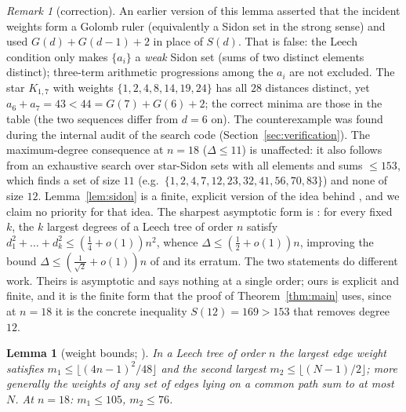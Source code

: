 \documentclass[11pt,a4paper]{article}
\theoremstyle{plain}
\newtheorem{lemma}[theorem]{Lemma}
\theoremstyle{remark}
\newtheorem*{remark*}{Remark}
\begin{document}
\begin{remark*}[correction]
An earlier version of this lemma asserted that the incident weights form a
Golomb ruler (equivalently a Sidon set in the strong sense) and used
$G(d)+G(d-1)+2$ in place of $S(d)$.  That is false: the Leech condition only
makes $\{a_i\}$ a \emph{weak} Sidon set (sums of two distinct elements
distinct); three-term arithmetic progressions among the $a_i$ are not excluded.
The star $K_{1,7}$ with weights $\{1,2,4,8,14,19,24\}$ has all $28$ distances
distinct, yet $a_6+a_7=43<44=G(7)+G(6)+2$; the correct minima are those in the
table (the two sequences differ from $d=6$ on).  The counterexample was found
during the internal audit of the search code (Section~\ref{sec:verification}).
The maximum-degree consequence at $n=18$ ($\Delta\le 11$) is unaffected: it
also follows from an exhaustive search over star-Sidon sets with all elements
and sums $\le 153$, which finds a set of size $11$ (e.g.\
$\{1,2,4,7,12,23,32,41,56,70,83\}$) and none of size $12$.
Lemma~\ref{lem:sidon} is a finite, explicit version of the idea behind
\cite[Thm.~3]{SzekelyWangZhang2005}, and we claim no priority for that idea.
The sharpest asymptotic form is \cite[Thm.~1.4]{LuoYu2024}: for every fixed
$k$, the $k$ largest degrees of a Leech tree of order $n$ satisfy
$d_1^2+\dots+d_k^2\le(\tfrac14+o(1))n^2$, whence
$\Delta\le(\tfrac12+o(1))n$, improving the bound
$\Delta\le(\tfrac1{\sqrt2}+o(1))n$ of \cite{SzekelyWangZhang2005} and its
erratum.  The two statements do different work.  Theirs is asymptotic and says
nothing at a single order; ours is explicit and finite, and it is the finite
form that the proof of Theorem~\ref{thm:main} uses, since at $n=18$ it is the
concrete inequality $S(12)=169>153$ that removes degree $12$.
\end{remark*}

\begin{lemma}[weight bounds; {\cite[Thms.~2.8, 2.9]{Calhoun2007}}]\label{lem:weights}
In a Leech tree of order $n$ the largest edge weight satisfies
$m_1\le\lfloor(4n-1)^2/48\rfloor$ and the second largest
$m_2\le\lfloor(N-1)/2\rfloor$; more generally the weights of any set of edges
lying on a common path sum to at most $N$.  At $n=18$: $m_1\le 105$,
$m_2\le 76$.
\end{lemma}
\end{document}
